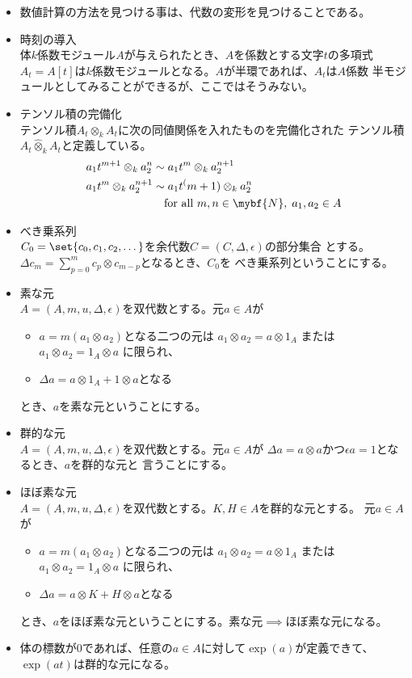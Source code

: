 	\begin{itemize} %
		\item 数値計算の方法を見つける事は、代数の変形を見つけることである。
		\item 時刻の導入 \\
		体$k$係数モジュール$A$が与えられたとき、$A$を係数とする文字$t$の多項式
		$A_t=A[t]$は$k$係数モジュールとなる。$A$が半環であれば、$A_t$は$A$係数
		半モジュールとしてみることができるが、ここではそうみない。
		\item テンソル積の完備化 \\
		テンソル積$A_t\otimes_kA_t$に次の同値関係を入れたものを完備化された
		テンソル積$A_t\widehat{\otimes}_kA_t$と定義している。
		\begin{equation}\begin{split} %
			a_1t^{m+1}\otimes_ka_2^n &\sim a_1t^m\otimes_ka_2^{n+1} \\
			a_1t^m\otimes_ka_2^{n+1} &\sim a_1t^(m+1)\otimes_ka_2^n \\
			&\quad\text{for all }m,n\in\mybf{N},\;a_1,a_2\in A \\
		\end{split}\end{equation} %
		\item べき乗系列 \\
		$C_0=\set{c_0,c_1,c_2,\dots}$を余代数$C=(C,\Delta,\epsilon)$の部分集合
		とする。$\Delta c_m=\sum_{p=0}^mc_p\otimes c_{m-p}$となるとき、$C_0$を
		べき乗系列ということにする。
		\item 素な元 \\
		$A=(A,m,u,\Delta,\epsilon)$を双代数とする。元$a\in A$が
		\begin{itemize} %
			\item $a=m(a_1\otimes  a_2)$となる二つの元は
			$a_1\otimes a_2=a\otimes 1_A$ または$a_1\otimes a_2=1_A\otimes a$
			に限られ、
			\item $\Delta a=a\otimes 1_A+1\otimes a$となる
		\end{itemize} %
		とき、$a$を素な元ということにする。
		\item 群的な元 \\
		$A=(A,m,u,\Delta,\epsilon)$を双代数とする。元$a\in A$が
		$\Delta a=a\otimes a$かつ$\epsilon a=1$となるとき、$a$を群的な元と
		言うことにする。
		\item ほぼ素な元 \\
		$A=(A,m,u,\Delta,\epsilon)$を双代数とする。$K,H\in A$を群的な元とする。
		元$a\in A$が
		\begin{itemize} %
			\item $a=m(a_1\otimes  a_2)$となる二つの元は
			$a_1\otimes a_2=a\otimes 1_A$ または$a_1\otimes a_2=1_A\otimes a$
			に限られ、
			\item $\Delta a=a\otimes K+H\otimes a$となる
		\end{itemize} %
		とき、$a$をほぼ素な元ということにする。素な元$\implies$ほぼ素な元になる。
		\item 体の標数が$0$であれば、任意の$a\in A$に対して$\exp(a)$が定義できて、
		$\exp(at)$は群的な元になる。
	\end{itemize} %


